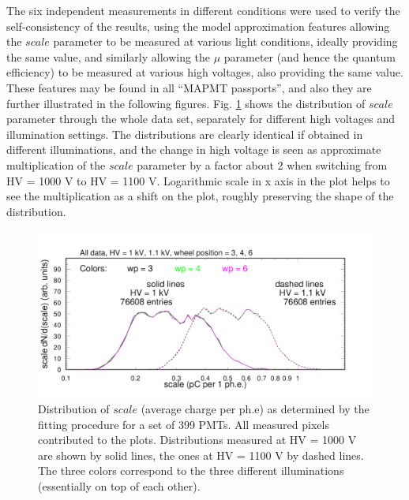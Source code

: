 The six independent measurements in different conditions were used to verify the self-consistency of the results, using the model approximation features allowing the $scale$ parameter to be measured at various light conditions, ideally providing the same value, and similarly allowing the $\mu$ parameter (and hence the quantum efficiency) to be measured at various high voltages, also providing the same value. These features may be found in all ``MAPMT passports'', and also they are further illustrated in the following figures. Fig. \ref{fig:pglobal_sc} shows the distribution of $scale$ parameter through the whole data set, separately for different high voltages and illumination settings. The distributions are clearly identical if obtained in different illuminations, and the change in high voltage is seen as approximate multiplication of the $scale$ parameter by a factor about 2 when switching from HV = 1000 V to HV = 1100 V. Logarithmic scale in x axis in the plot helps to see the multiplication as a shift on the plot, roughly preserving the shape of the distribution. 
\begin{figure}[hbt]
	\centering
	\includegraphics[width=0.98\linewidth,trim=0 15 50 35,clip]{figures/pglobal_sc.pdf}
	\caption{Distribution of $scale$ (average charge per ph.e) as determined by the fitting procedure for a set of 399 PMTs. All measured pixels contributed to the plots. Distributions measured at HV = 1000 V are shown by solid lines, the ones at HV = 1100 V by dashed lines. The three colors correspond to the three different illuminations (essentially on top of each other).
	}
	\label{fig:pglobal_sc}
\end{figure}

